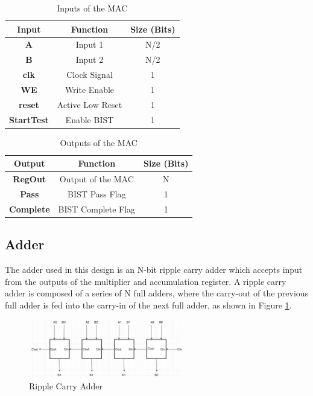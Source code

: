 \documentclass[11pt]{article}
\begin{document}
		\begin{table}[H]
			\centering
			\caption{Inputs of the MAC}
			\label{tab:Inputs}
			\begin{tabular}{|ccc|}
				\hline
				\textbf{}   \textbf{Input}      & \textbf{Function} &  \textbf{Size (Bits)} \\
				\hline
				\textbf{A}  & Input 1 & N/2          \\
				\textbf{B}  & Input 2 & N/2            \\ 
				\textbf{clk}  & Clock Signal & 1        \\ 
				\textbf{WE}  & Write Enable & 1           \\ 
				\textbf{reset}  & Active Low Reset & 1           \\ 
				\textbf{StartTest}  & Enable BIST & 1           \\ 
				\hline                     
			\end{tabular}
		\end{table}
		
		\begin{table}[H]
			\centering
			\caption{Outputs of the MAC}
			\label{tab:Outputs}
			\begin{tabular}{|ccc|}
				\hline
				\textbf{}   \textbf{Output}      & \textbf{Function} &  \textbf{Size (Bits)} \\
				\hline
				\textbf{RegOut}  & Output of the MAC & N          \\
				\textbf{Pass}  & BIST Pass Flag & 1            \\ 
				\textbf{Complete}  & BIST Complete Flag & 1        \\ 
				\hline                     
			\end{tabular}
		\end{table}
	

	\subsection{Adder}
	
		The adder used in this design is an N-bit ripple carry adder which accepts input from the outputs of the multiplier and accumulation register. A ripple carry adder is composed of a series of N full adders, where the carry-out of the previous full adder is fed into the carry-in of the next full adder, as shown in Figure \ref{fig:ripple-carry-adder}.
		
		\begin{figure}[H]
			\centering
			\includegraphics[width=0.6\textwidth,height=\dimexpr\textheight-4\baselineskip-\abovecaptionskip-\belowcaptionskip\relax,keepaspectratio]{"Pictures/Ripple Carry Adder"}
			\caption{Ripple Carry Adder}
			\label{fig:ripple-carry-adder}
		\end{figure}
		
\end{document}
